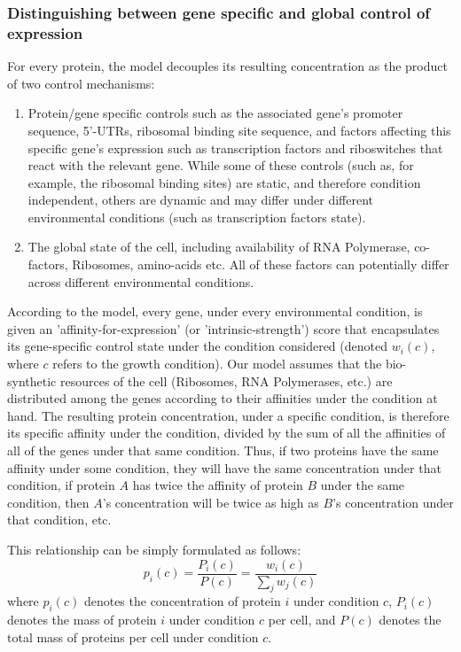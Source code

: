 \documentclass[notitlepage]{article}
\begin{document}
\subsubsection{Distinguishing between gene specific and global control of expression}
For every protein, the model decouples its resulting concentration as the product of two control mechanisms:
\begin{enumerate}
\item Protein/gene specific controls such as the associated gene's promoter sequence, 5'-UTRs, ribosomal binding site sequence, and factors affecting this specific gene's expression such as transcription factors and riboswitches that react with the relevant gene.
  While some of these controls (such as, for example, the ribosomal binding sites) are static, and therefore condition independent, others are dynamic and may differ under different environmental conditions (such as transcription factors state).
\item The global state of the cell, including availability of RNA Polymerase, co-factors, Ribosomes, amino-acids etc.
  All of these factors can potentially differ across different environmental conditions.
\end{enumerate}
According to the model, every gene, under every environmental condition, is given an 'affinity-for-expression' (or 'intrinsic-strength') score that encapsulates its gene-specific control state under the condition considered (denoted $w_i(c)$, where $c$ refers to the growth condition).
Our model assumes that the bio-synthetic resources of the cell (Ribosomes, RNA Polymerases, etc.) are distributed among the genes according to their affinities under the condition at hand.
The resulting protein concentration, under a specific condition, is therefore its specific affinity under the condition, divided by the sum of all the affinities of all of the genes under that same condition.
Thus, if two proteins have the same affinity under some condition, they will have the same concentration under that condition, if protein $A$ has twice the affinity of protein $B$ under the same condition, then $A$'s concentration will be twice as high as $B$'s concentration under that condition, etc.

This relationship can be simply formulated as follows:
\begin{equation}
  \label{eq:concentration-ratio}
  p_i(c)=\frac{P_i(c)}{P(c)}=\frac{w_i(c)}{\sum_jw_j(c)}
\end{equation}
where $p_i(c)$ denotes the concentration of protein $i$ under condition $c$, $P_i(c)$ denotes the mass of protein $i$ under condition $c$ per cell, and $P(c)$ denotes the total mass of proteins per cell under condition $c$.
\end{document}
